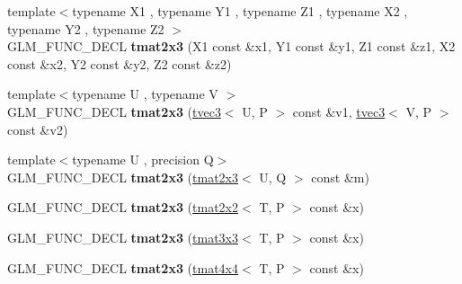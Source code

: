 \begin{DoxyCompactItemize}
\item 
\hypertarget{structglm_1_1detail_1_1tmat2x3_ac112d37bc3331b1735c1aeb591483bc0}{{\footnotesize template$<$typename X1 , typename Y1 , typename Z1 , typename X2 , typename Y2 , typename Z2 $>$ }\\G\-L\-M\-\_\-\-F\-U\-N\-C\-\_\-\-D\-E\-C\-L {\bfseries tmat2x3} (X1 const \&x1, Y1 const \&y1, Z1 const \&z1, X2 const \&x2, Y2 const \&y2, Z2 const \&z2)}\label{structglm_1_1detail_1_1tmat2x3_ac112d37bc3331b1735c1aeb591483bc0}

\item 
\hypertarget{structglm_1_1detail_1_1tmat2x3_ab39c2ee73d04fb527773418e6595be57}{{\footnotesize template$<$typename U , typename V $>$ }\\G\-L\-M\-\_\-\-F\-U\-N\-C\-\_\-\-D\-E\-C\-L {\bfseries tmat2x3} (\hyperlink{structglm_1_1detail_1_1tvec3}{tvec3}$<$ U, P $>$ const \&v1, \hyperlink{structglm_1_1detail_1_1tvec3}{tvec3}$<$ V, P $>$ const \&v2)}\label{structglm_1_1detail_1_1tmat2x3_ab39c2ee73d04fb527773418e6595be57}

\item 
\hypertarget{structglm_1_1detail_1_1tmat2x3_aeada8034e24714a14c9d2480f5cf2fb6}{{\footnotesize template$<$typename U , precision Q$>$ }\\G\-L\-M\-\_\-\-F\-U\-N\-C\-\_\-\-D\-E\-C\-L {\bfseries tmat2x3} (\hyperlink{structglm_1_1detail_1_1tmat2x3}{tmat2x3}$<$ U, Q $>$ const \&m)}\label{structglm_1_1detail_1_1tmat2x3_aeada8034e24714a14c9d2480f5cf2fb6}

\item 
\hypertarget{structglm_1_1detail_1_1tmat2x3_a37bd9202b87e73c3d6e36cadce414457}{G\-L\-M\-\_\-\-F\-U\-N\-C\-\_\-\-D\-E\-C\-L {\bfseries tmat2x3} (\hyperlink{structglm_1_1detail_1_1tmat2x2}{tmat2x2}$<$ T, P $>$ const \&x)}\label{structglm_1_1detail_1_1tmat2x3_a37bd9202b87e73c3d6e36cadce414457}

\item 
\hypertarget{structglm_1_1detail_1_1tmat2x3_a1f1c6b71411b314a015c589cbbe34f7a}{G\-L\-M\-\_\-\-F\-U\-N\-C\-\_\-\-D\-E\-C\-L {\bfseries tmat2x3} (\hyperlink{structglm_1_1detail_1_1tmat3x3}{tmat3x3}$<$ T, P $>$ const \&x)}\label{structglm_1_1detail_1_1tmat2x3_a1f1c6b71411b314a015c589cbbe34f7a}

\item 
\hypertarget{structglm_1_1detail_1_1tmat2x3_a4dc8800ba18dd4b395c68faf51009776}{G\-L\-M\-\_\-\-F\-U\-N\-C\-\_\-\-D\-E\-C\-L {\bfseries tmat2x3} (\hyperlink{structglm_1_1detail_1_1tmat4x4}{tmat4x4}$<$ T, P $>$ const \&x)}\label{structglm_1_1detail_1_1tmat2x3_a4dc8800ba18dd4b395c68faf51009776}


\end{DoxyCompactItemize}
